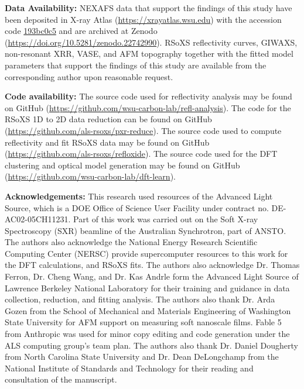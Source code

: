 \textbf{Data Availability:} NEXAFS data that support the findings of this study have been deposited in X-ray Atlas (\url{https://xrayatlas.wsu.edu}) with the accession code \href{http://xrayatlas.wsu.edu/d/193bc0c5}{193bc0c5} and are archived at Zenodo (\url{https://doi.org/10.5281/zenodo.22742990}).\autocite{atlas_10_5281_zenodo_22742990} RSoXS reflectivity curves, GIWAXS, non-resonant XRR, VASE, and AFM topography together with the fitted model parameters that support the findings of this study are available from the corresponding author upon reasonable request.

\textbf{Code availability:} The source code used for reflectivity analysis may be found on GitHub (\url{https://github.com/wsu-carbon-lab/refl-analysis}).\autocite{Charles2013} The code for the RSoXS 1D to 2D data reduction can be found on GitHub (\url{https://github.com/als-rsoxs/pxr-reduce}).\autocite{ALSRSOXSPxrreduce2026} The source code used to compute reflectivity and fit RSoXS data may be found on GitHub (\url{https://github.com/als-rsoxs/refloxide}).\autocite{ALSRSOXSRefloxide2026a} The source code used for the DFT clustering and optical model generation may be found on GitHub (\url{https://github.com/wsu-carbon-lab/dft-learn}).\autocite{victormurciaWSUCarbonLabDFTClustering2025}

\textbf{Acknowledgements:} This research used resources of the Advanced Light Source, which is a DOE Office of Science User Facility under contract no. DE-AC02-05CH11231. Part of this work was carried out on the Soft X-ray Spectroscopy (SXR) beamline of the Australian Synchrotron, part of ANSTO. The authors also acknowledge the National Energy Research Scientific Computing Center (NERSC) provide supercomputer resources to this work for the DFT calculations, and RSoXS fits. The authors also acknowledge Dr. Thomas Ferron, Dr. Cheng Wang, and Dr. Kas Andrle form the Advanced Light Source of Lawrence Berkeley National Laboratory for their training and guidance in data collection, reduction, and fitting analysis. The authors also thank Dr. Arda Gozen from the School of Mechanical and Materials Engineering of Washington State University for AFM support on measuring soft nanoscale films. Fable 5 from Anthropic was used for minor copy editing and code generation under the ALS computing group's team plan. The authors also thank Dr. Daniel Dougherty from North Carolina State University and Dr. Dean DeLongchamp from the National Institute of Standards and Technology for their reading and consultation of the manuscript.
